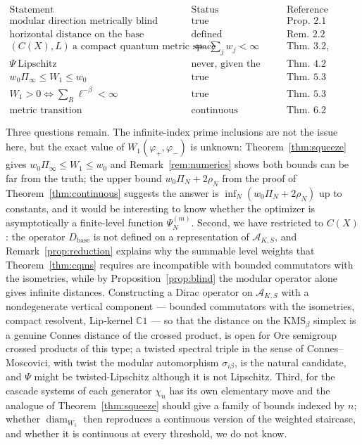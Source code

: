 \documentclass[11pt]{amsart}
\numberwithin{equation}{section}
\theoremstyle{definition}
\theoremstyle{remark}
\newcommand{\C}{\mathbb{C}}
\newcommand{\cA}{\mathcal{A}}
\newcommand{\diam}{\operatorname{diam}}
\newcommand{\Db}{D_{\mathrm{base}}}
\begin{document}
\[
\begin{array}{lll}
\text{Statement} & \text{Status} & \text{Reference}\\\hline
\text{modular direction metrically blind} & \text{true} & \text{Prop.~2.1}\\
\text{horizontal distance on the base} & \text{defined} & \text{Rem.~2.2}\\
(C(X),L)\ \text{a compact quantum metric space} & \iff\ \textstyle\sum_jw_j<\infty & \text{Thm.~3.2, Rem.~3.3}\\
\Psi\ \text{Lipschitz} & \text{never, given the above} & \text{Thm.~4.2}\\
w_0\Pi_\infty\le W_1\le w_0 & \text{true} & \text{Thm.~5.3}\\
W_1>0\iff\sum_R\ell^{-\beta}<\infty & \text{true} & \text{Thm.~5.3}\\
\text{metric transition} & \text{continuous} & \text{Thm.~6.2}
\end{array}
\]

Three questions remain. The infinite-index prime inclusions are not the issue here, but the
exact value of $W_1(\varphi_+,\varphi_-)$ is unknown: Theorem~\ref{thm:squeeze} gives
$w_0\Pi_\infty\le W_1\le w_0$ and Remark~\ref{rem:numerics} shows both bounds can be far
from the truth; the upper bound $w_0\Pi_N+2\rho_N$ from the proof of
Theorem~\ref{thm:continuous} suggests the answer is $\inf_N(w_0\Pi_N+2\rho_N)$ up to
constants, and it would be interesting to know whether the optimizer is asymptotically a
finite-level function $\Psi^{(m)}_N$. Second, we have restricted to $C(X)$: the operator $\Db$ is not defined on a
representation of $\cA_{K,S}$, and Remark~\ref{prop:reduction} explains why the summable
level weights that Theorem~\ref{thm:cqms} requires are incompatible with bounded
commutators with the isometries, while by Proposition~\ref{prop:blind} the modular operator
alone gives infinite distances. Constructing a Dirac operator on $\cA_{K,S}$ with a
nondegenerate vertical component --- bounded commutators with the isometries, compact
resolvent, Lip-kernel $\C1$ --- so that the distance on the $\mathrm{KMS}_\beta$ simplex is
a genuine Connes distance of the crossed product, is open for Ore semigroup crossed
products of this type; a twisted spectral triple in the sense of Connes--Moscovici, with
twist the modular automorphism $\sigma_{i\beta}$, is the natural candidate, and $\Psi$ might
be twisted-Lipschitz although it is not Lipschitz.
Third, for the cascade systems of \cite{SeriesI} each generator $\chi_n$ has its own
elementary move and the analogue of Theorem~\ref{thm:squeeze} should give a family of bounds
indexed by $n$; whether $\diam_{W_1}$ then reproduces a continuous version of the weighted
staircase, and whether it is continuous at every threshold, we do not know.
\end{document}
